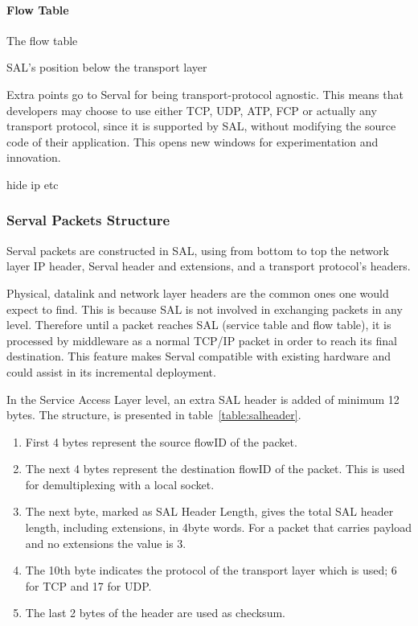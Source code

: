 \paragraph{Flow Table} The flow table 

SAL's position below the transport layer 

Extra points go to Serval for being transport-protocol agnostic.
This means that developers may choose to use either TCP, UDP, ATP, FCP or actually any transport protocol, since it is supported by SAL, without modifying the source code of their application.
This opens new windows for experimentation and innovation.


hide ip etc





\subsubsection{Serval Packets Structure}
Serval packets are constructed in SAL, using from bottom to top the network layer IP header, Serval header and extensions, and a transport protocol's headers.

Physical, datalink and network layer headers are the common ones one would expect to find.
This is because SAL is not involved in exchanging packets in any level.
Therefore until a packet reaches SAL (service table and flow table), it is processed by middleware as a normal TCP/IP packet in order to reach its final destination.
This feature makes Serval compatible with existing hardware and could assist in its incremental deployment.

In the Service Access Layer level, an extra SAL header is added of minimum 12 bytes.
The structure, is presented in table~\ref{table:salheader}.
\begin{enumerate} \itemsep1pt \parskip0pt 
  \item First 4 bytes represent the source flowID of the packet.
  \item The next 4 bytes represent the destination flowID of the packet.
  This is used for demultiplexing with a local socket.
  \item The next byte, marked as SAL Header Length, gives the total SAL header length, including extensions, in 4byte words.
  For a packet that carries payload and no extensions the value is 3.
  \item The 10th byte indicates the protocol of the transport layer which is used; 6 for TCP and 17 for UDP.
  \item The last 2 bytes of the header are used as checksum.
\end{enumerate}

